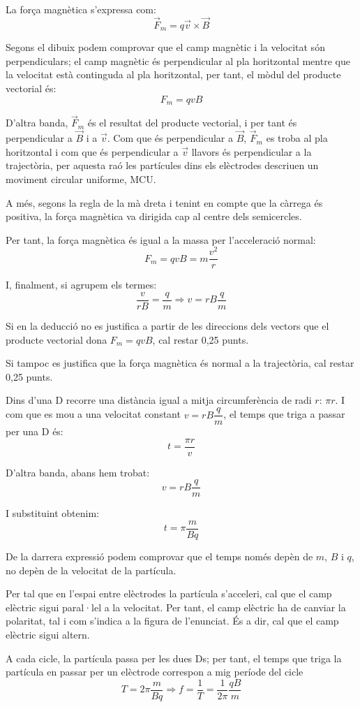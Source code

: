 \begin{solapartat}
 La força magnètica s'expressa com:
\[ \vec{F}_m = q\vec{v}\times\vec{B} \]


Segons el dibuix podem comprovar que el camp magnètic i la velocitat són perpendiculars; el camp magnètic és perpendicular al pla horitzontal mentre que la velocitat està continguda al pla horitzontal, per tant, el mòdul del producte vectorial és:
\[ F_m = qvB \]


D'altra banda, $\vec{F}_m$ és el resultat del producte vectorial, i per tant és perpendicular a $\vec{B}$ i a $\vec{v}$. Com que és perpendicular a $\vec{B}$, $\vec{F}_m$ es troba al pla horitzontal i com que és perpendicular a $\vec{v}$ llavors és perpendicular a la trajectòria, per aquesta raó les partícules dins els elèctrodes descriuen un moviment circular uniforme, MCU.

A més, segons la regla de la mà dreta i tenint en compte que la càrrega és positiva, la força magnètica va dirigida cap al centre dels semicercles.

Per tant, la força magnètica és igual a la massa per l'acceleració normal:
\[ F_m = qvB = m\frac{v^2}{r} \]

I, finalment, si agrupem els termes:
\[ \frac{v}{rB} = \frac{q}{m} \Rightarrow v = rB\frac{q}{m} \]

Si en la deducció no es justifica a partir de les direccions dels vectors que el producte vectorial dona $F_m = qvB$, cal restar 0,25 punts.

Si tampoc es justifica que la força magnètica és normal a la trajectòria, cal restar 0,25 punts.

 Dins d'una D recorre una distància igual a mitja circumferència de radi $r$: $\pi r$. I com que es mou a una velocitat constant $v = rB\dfrac{q}{m}$, el temps que triga a passar per una D és:
\[ t = \frac{\pi r}{v} \]

D'altra banda, abans hem trobat:
\[ v = rB\frac{q}{m} \]

I substituint obtenim:
\[ t = \pi\frac{m}{Bq} \]

De la darrera expressió podem comprovar que el temps només depèn de $m$, $B$ i $q$, no depèn de la velocitat de la partícula.

 Per tal que en l'espai entre elèctrodes la partícula s'acceleri, cal que el camp elèctric sigui paral·lel a la velocitat. Per tant, el camp elèctric ha de canviar la polaritat, tal i com s'indica a la figura de l'enunciat. És a dir, cal que el camp elèctric sigui altern.

 A cada cicle, la partícula passa per les dues Ds; per tant, el temps que triga la partícula en passar per un elèctrode correspon a mig període del cicle
\[ T = 2\pi\frac{m}{Bq} \Rightarrow f = \frac{1}{T} = \frac{1}{2\pi}\frac{qB}{m} \]
\end{solapartat}

